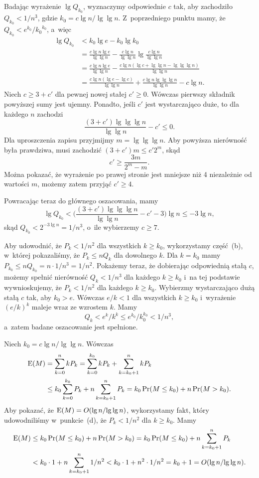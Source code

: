 \subproblem %

\noindent Badając wyrażenie $\lg Q_{k_0}$, wyznaczymy odpowiednie $c$ tak, aby zachodziło $Q_{k_0}<1/n^3$, gdzie $k_0=c\lg n/\!\lg\lg n$.
Z~poprzedniego punktu mamy, że $Q_{k_0}<e^{k_0}\!/{k_0}^{k_0}$, a~więc
\begin{align*}
	\lg Q_{k_0} &< k_0\lg e-k_0\lg k_0 \\
	&= \frac{c\lg n\lg e}{\lg\lg n}-\frac{c\lg n}{\lg\lg n}\lg\frac{c\lg n}{\lg\lg n} \\[1mm]
	&= \frac{c\lg n\lg e}{\lg\lg n}-\frac{c\lg n(\lg c+\lg\lg n-\lg\lg\lg n)}{\lg\lg n} \\[1mm]
	&= \frac{c\lg n(\lg e-\lg c)}{\lg\lg n}+\frac{c\lg n\lg\lg\lg n}{\lg\lg n}-c\lg n.
\end{align*}
Niech $c\ge3+c'$ dla pewnej nowej stałej $c'\ge0$.
Wówczas pierwszy składnik powyższej sumy jest ujemny.
Ponadto, jeśli $c'$ jest wystarczająco duże, to dla każdego $n$ zachodzi
\[
	\frac{(3+c')\lg\lg\lg n}{\lg\lg n}-c' \le 0.
\]
Dla uproszczenia zapisu przyjmijmy $m=\lg\lg\lg n$.
Aby powyższa nierówność była prawdziwa, musi zachodzić $(3+c')m\le c'2^m$, skąd
\[
	c' \ge \frac{3m}{2^m-m}.
\]
Można pokazać, że wyrażenie po prawej stronie jest mniejsze niż 4 niezależnie od wartości $m$, możemy zatem przyjąć $c'\ge4$.

Powracając teraz do głównego oszacowania, mamy
\[
	\lg Q_{k_0} < \biggl(\frac{(3+c')\lg\lg\lg n}{\lg\lg n}-c'-3\biggr)\lg n \le -3\lg n,
\]
skąd $Q_{k_0}<2^{-3\lg n}=1/n^3$, o~ile wybierzemy $c\ge7$.

Aby udowodnić, że $P_k<1/n^2$ dla wszystkich $k\ge k_0$, wykorzystamy część~(b), w~której pokazaliśmy, że $P_k\le nQ_k$ dla dowolnego $k$.
Dla $k=k_0$ mamy $P_{k_0}\le nQ_{k_0}=n\cdot1/n^3=1/n^2$.
Pokażemy teraz, że dobierając odpowiednią stałą $c$, możemy spełnić nierówność $Q_k<1/n^3$ dla każdego $k\ge k_0$ i~na tej podstawie wywnioskujemy, że $P_k<1/n^2$ dla każdego $k\ge k_0$.
Wybierzmy wystarczająco dużą stałą $c$ tak, aby $k_0>e$.
Wówczas $e/k<1$ dla wszystkich $k\ge k_0$ i~wyrażenie $(e/k)^k$ maleje wraz ze wzrostem $k$.
Mamy
\[
	Q_k < e^k\!/k^k \le e^{k_0}\!/k_0^{k_0} < 1/n^3,
\]
a~zatem badane oszacowanie jest spełnione.

\subproblem %
Niech $k_0=c\lg n/\!\lg\lg n$.
Wówczas
\begin{align*}
	\operatorname{E}(M) &= \sum_{k=0}^nkP_k = \sum_{k=0}^{k_0}kP_k+\sum_{k=k_0+1}^nkP_k \\
	&\le k_0\sum_{k=0}^{k_0}P_k+n\sum_{k=k_0+1}^nP_k = k_0\Pr(M\le k_0)+n\Pr(M>k_0).
\end{align*}
Aby pokazać, że $\operatorname{E}(M)=O(\lg n/\!\lg\lg n)$, wykorzystamy fakt, który udowodniliśmy w~punkcie~(d), że $P_k<1/n^2$ dla $k\ge k_0$.
Mamy
\begin{align*}
	\operatorname{E}(M) &\le k_0\Pr(M\le k_0)+n\Pr(M>k_0) = k_0\Pr(M\le k_0)+n\sum_{k=k_0+1}^nP_k \\
	&< k_0\cdot1+n\sum_{k=k_0+1}^n1/n^2 < k_0\cdot1+n^2\cdot1/n^2 = k_0+1 = O(\lg n/\!\lg\lg n).
\end{align*}

